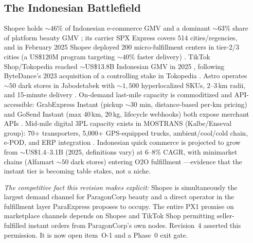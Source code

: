 \subsection{The Indonesian Battlefield}
Shopee holds ${\sim}46\%$ of Indonesian e-commerce GMV and a dominant ${\sim}63\%$ share of platform beauty GMV \cite{magpieiq2026,databoks2024}; its carrier SPX Express covers 514 cities/regencies, and in February 2025 Shopee deployed 200 micro-fulfillment centers in tier-2/3 cities (a US\$120M program targeting ${\sim}40\%$ faster delivery) \cite{spx2025,mordor2024}. TikTok Shop/Tokopedia reached ${\sim}$US\$13.8B Indonesian GMV in 2025 \cite{moca2026}, following ByteDance's 2023 acquisition of a controlling stake in Tokopedia \cite{nikkei2023}. Astro operates ${\sim}50$ dark stores in Jabodetabek with ${\sim}1{,}500$ hyperlocalized SKUs, 2--3\,km radii, and 15-minute delivery \cite{theken2023,gpca2024}. On-demand last-mile capacity is commoditized and API-accessible: GrabExpress Instant (pickup ${\sim}30$ min, distance-based per-km pricing) and GoSend Instant (max 40\,km, 20\,kg, lifecycle webhooks) both expose merchant APIs \cite{grab2025,gojek2024}. Mid-mile digital 3PL capacity exists in MOSTRANS (Kalbe/Enseval group): 70+ transporters, 5,000+ GPS-equipped trucks, ambient/cool/cold chain, e-POD, and ERP integration \cite{ssi2022,kalbe2019}. Indonesian quick commerce is projected to grow from ${\sim}$US\$1.4--3.1B (2025, definitions vary) at 6--8\% CAGR, with minimarket chains (Alfamart ${\sim}50$ dark stores) entering O2O fulfillment \cite{rm2026}---evidence that the instant tier is becoming table stakes, not a niche.

\emph{The competitive fact this revision makes explicit:} Shopee is simultaneously the largest demand channel for ParagonCorp beauty and a direct operator in the fulfillment layer ParaExpress proposes to occupy. The entire PX1 promise on marketplace channels depends on Shopee and TikTok Shop permitting seller-fulfilled instant orders from ParagonCorp's own nodes. Revision~4 asserted this permission. It is now open item~O-1 and a Phase~0 exit gate. 

